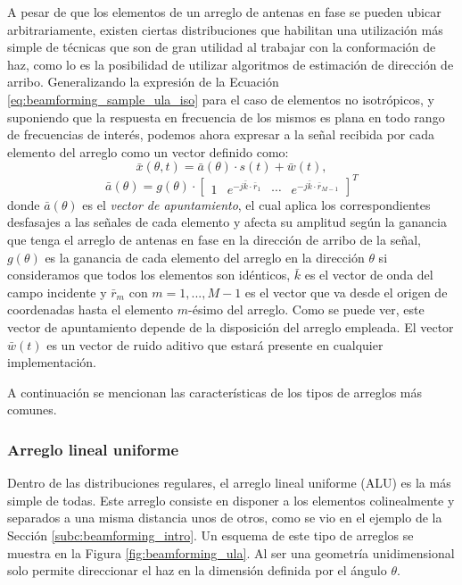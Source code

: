 A pesar de que los elementos de un arreglo de antenas en fase se pueden ubicar arbitrariamente, existen ciertas distribuciones que habilitan una utilización más simple de técnicas que son de gran utilidad al trabajar con la conformación de haz, como lo es la posibilidad de utilizar algoritmos de estimación de dirección de arribo. Generalizando la expresión de la Ecuación \ref{eq:beamforming_sample_ula_iso} para el caso de elementos no isotrópicos, y suponiendo que la respuesta en frecuencia de los mismos es plana en todo rango de frecuencias de interés, podemos ahora expresar a la señal recibida por cada elemento del arreglo como un vector definido como:
\begin{equation}
    \bar{x} (\theta,t)  =\bar{a}(\theta)\cdot s(t) + \bar{w}(t),
    \label{eq:beamforming_singlesignal}
\end{equation}
\begin{equation}
    \bar{a}(\theta)     = g(\theta)\cdot \begin{bmatrix}
        1 & e^{-j\bar{k}\cdot \bar{r}_1} & \cdots & e^{-j\bar{k}\cdot \bar{r}_{M-1}}
    \end{bmatrix}^T
    \label{eq:beamforming_stearingvector}
\end{equation}
donde $\bar{a}(\theta)$ es el \emph{vector de apuntamiento}, el cual aplica los correspondientes desfasajes a las señales de cada elemento y afecta su amplitud según la ganancia que tenga el arreglo de antenas en fase en la dirección de arribo de la señal, $g(\theta)$ es la ganancia de cada elemento del arreglo en la dirección $\theta$ si consideramos que todos los elementos son idénticos, $\bar{k}$ es el vector de onda del campo incidente y $\bar{r}_m$ con $m=1,...,M-1$ es el vector que va desde el origen de coordenadas hasta el elemento $m$-ésimo del arreglo. Como se puede ver, este vector de apuntamiento depende de la disposición del arreglo empleada. El vector $\bar{w}(t)$ es un vector de ruido aditivo que estará presente en cualquier implementación.

A continuación se mencionan las características de los tipos de arreglos más comunes.

\subsubsection{Arreglo lineal uniforme}

Dentro de las distribuciones regulares, el arreglo lineal uniforme (ALU) es la más simple de todas. Este arreglo consiste en disponer a los elementos colinealmente y separados a una misma distancia unos de otros, como se vio en el ejemplo de la Sección \ref{subc:beamforming_intro}. Un esquema de este tipo de arreglos se muestra en la Figura \ref{fig:beamforming_ula}. Al ser una geometría unidimensional solo permite direccionar el haz en la dimensión definida por el ángulo $\theta$.

